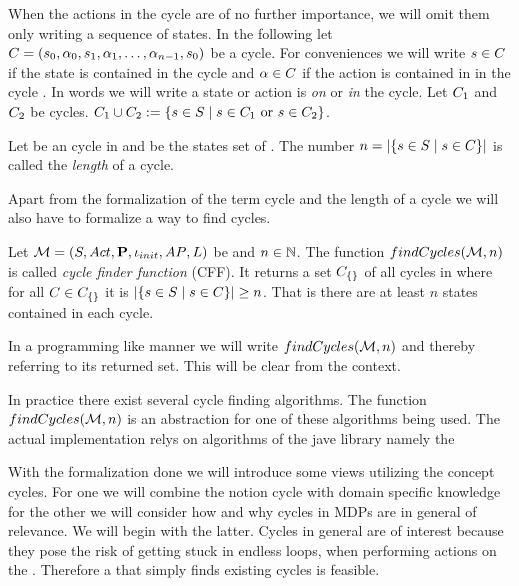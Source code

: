 \documentclass[preview]{standalone}
\begin{document}
When the actions in the cycle are of no further importance, we will omit them only writing a sequence of states. In the following let ${C} = {({s}_0, {\alpha}_0, {s}_1, {\alpha}_1, \dots, {\alpha}_{n-1}, {s}_0)}$ be a cycle. For conveniences we will write ${s} \in {C}$ if the state is contained in the cycle \cycle and ${\alpha} \in {C}$ if the action is contained in in the cycle \cycle.  In words we will write a state or action is \emph{on} or \emph{in} the cycle. Let ${C}_1$ and ${C}_2$ be cycles. ${C}_1 \cup {C}_2 := \{{s} \in {S} \mid {s} \in {C}_1 \text{ or } {s} \in {C}_2\}$.

\begin{definition}
	Let \cycle be an cycle in \chgph and \states be the states set of \chgph. The number $n = |\{{s} \in {S} \mid {s} \in {C}\}|$ is called the \emph{length} of a cycle. 
\end{definition}

Apart from the formalization of the term cycle and the length of a cycle we will also have to formalize a way to find cycles.

\begin{definition}
	Let ${{{\mathcal{M}}}} = {{({S}, {Act}, {\textbf{P}}, {\iota_{init}}, {AP}, {L})}}$ be \chosengraphtypeN and $n \in {\mathbb{N}}$. The function  ${findCycles}({{{\mathcal{M}}}}, n)$ is called \emph{cycle finder function} (CFF). It returns a set ${{C}_{\{\}}}$ of all cycles in \chgph where for all $\cycle \in \cycleset$ it is $|\{{s} \in {S} \mid {s} \in {C}\}| \geq n$. That is there are at least $n$ states contained in each cycle. 
\end{definition}

In a programming like manner we will write ${findCycles}({{{\mathcal{M}}}},n)$ and thereby referring to its returned set. This will be clear from the context.

In practice there exist several cycle finding algorithms. The function ${findCycles}({{{\mathcal{M}}}}, n)$ is an abstraction for one of these algorithms being used. The actual implementation relys on algorithms of the jave library \jgrapht namely the 

With the formalization done we will introduce some views utilizing the concept cycles. For one we will combine the notion cycle with domain specific knowledge for the other we will consider how and why cycles in MDPs are in general of relevance. We will begin with the latter.  Cycles in general are of interest because they pose the risk of getting stuck in endless loops, when performing actions on the \mdpN.  Therefore a \viewN that simply finds existing cycles is feasible.
\end{document}
